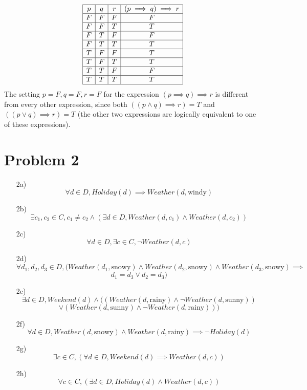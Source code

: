 \documentclass[12pt]{exam}
\begin{document}
\begin{itemize}
    $$\begin{array}{|c|c|c|c|}
        \hline
         p & q & r & (p \implies q) \implies r\\
         \hline
         F & F & F & F \\
         \hline
         F & F & T & T\\
         \hline
         F & T & F & F\\
         \hline
         F & T & T & T\\
         \hline
         T & F & F & T \\
         \hline
         T & F & T & T\\
         \hline
         T & T & F & F\\
         \hline
         T & T & T & T\\
         \hline
    \end{array}$$
    The setting $p = F, q = F, r = F$ for the expression $(p \implies q) \implies r$ is different from every other expression, since both $(( p \land q) \implies r) = T$ and $((p \lor q) \implies r) = T$ (the other two expressions are logically equivalent to one of these expressions).
\end{itemize}

\newpage
\section{Problem 2}

\begin{enumerate}
    \item[2a)] $$\forall d \in D, Holiday(d) \implies Weather(d, \text{windy})$$
    \item[2b)] $$ \exists c_1, c_2 \in C, c_1 \neq c_2 \land (\exists d \in D,
    Weather(d, c_1) \land Weather(d, c_2))$$
    \item[2c)] $$\forall d \in D, \exists c \in C, \lnot Weather(d, c)$$
    \item[2d)] $$\forall d_1, d_2, d_3 \in D, (Weather(d_1, \text{snowy}) \land Weather(d_2, \text{snowy}) \land Weather(d_3, \text{snowy}) \implies$$ $$d_1 = d_3 \lor d_2 = d_3)$$
    \item[2e)] $$\exists d \in D, Weekend(d) \land ((Weather(d, \text{rainy}) \land \lnot Weather(d, \text{sunny}))$$ $$\lor (Weather(d, \text{sunny}) \land \lnot Weather(d, \text{rainy})))$$
    \item[2f)] $$\forall d \in D, Weather(d, \text{snowy}) \land Weather(d, \text{rainy}) \implies \lnot Holiday(d)$$
    \item[2g)] $$\exists c \in C, (\forall d \in D, Weekend(d) \implies Weather(d, c))$$
    \item[2h)] $$\forall c \in C, (\exists d \in D, Holiday(d) \land Weather(d, c))$$
\end{enumerate}
\end{document}
